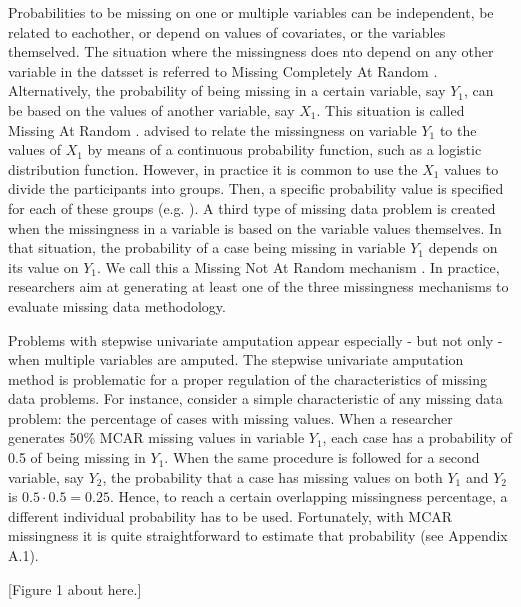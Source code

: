 \documentclass[]{interact}
\begin{document}
Probabilities to be missing on one or multiple variables can be independent, be related to eachother, or depend on values of covariates, or the variables themselved. The situation where the missingness does nto depend on any other variable in the datsset is referred to Missing Completely At Random \citep[i.e. MCAR,][]{Rubin1976}. Alternatively, the probability of being missing in a certain variable, say $Y_1$, can be based on the values of another variable, say $X_1$. This situation is called Missing At Random \citep[i.e. MAR,][]{Rubin1976}. \citep[][pp. 63, 64]{Stef2012} advised to relate the missingness on variable $Y_1$ to the values of $X_1$ by means of a continuous probability function, such as a logistic distribution function. However, in practice it is common to use the $X_1$ values to divide the participants into groups. Then, a specific probability value is specified for each of these groups (e.g. \citep{Kontopantelis2017, Allison2000, Yuan2012}). A third type of missing data problem is created when the missingness in a variable is based on the variable values themselves. In that situation, the probability of a case being missing in variable $Y_1$ depends on its value on $Y_1$. We call this a Missing Not At Random mechanism \citep[i.e. MNAR,][pp. 31, 32]{Rubin1987, Stef2012}. In practice, researchers aim at generating at least one of the three missingness mechanisms to evaluate missing data methodology.

Problems with stepwise univariate amputation appear especially - but not only - when multiple variables are amputed. The stepwise univariate amputation method is problematic for a proper regulation of the characteristics of missing data problems. For instance, consider a simple characteristic of any missing data problem: the percentage of cases with missing values. When a researcher generates 50\% MCAR missing values in variable $Y_1$, each case has a probability of 0.5 of being missing in $Y_1$. When the same procedure is followed for a second variable, say $Y_2$, the probability that a case has missing values on both $Y_1$ and $Y_2$ is $0.5 \cdot 0.5 = 0.25$. Hence, to reach a certain overlapping missingness percentage, a different individual probability has to be used. Fortunately, with MCAR missingness it is quite straightforward to estimate that probability (see Appendix A.1).

[Figure 1 about here.]
\end{document}
